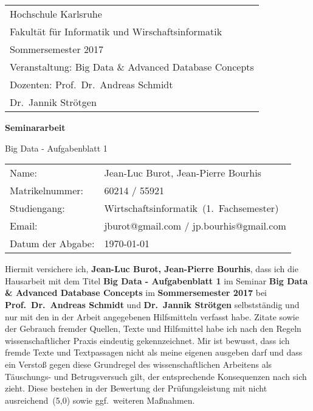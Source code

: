 \documentclass[
     11pt,         %
     a4paper,      %
     oneside,
     ]{article}
\makeatletter
\newcommand{\mytitle}{Big Data - Aufgabenblatt 1}
\newcommand{\myauthor}{Jean-Luc Burot, Jean-Pierre Bourhis}
\newcommand{\myseminar}{Big Data \& Advanced Database Concepts}
\newcommand{\mysemester}{Sommersemester 2017}
\newcommand{\mydozent}{Prof.~Dr.~Andreas Schmidt}
\newcommand{\mydozentTwo}{Dr.~Jannik Str\"otgen}
\newcommand{\myMatrikelnummer}{60214 / 55921}
\newcommand{\myStudiengang}{Wirtschaftsinformatik}
\newcommand{\mySemester}{1}
\newcommand{\myEmail}{jburot@gmail.com / jp.bourhis@gmail.com}
\makeatother
\begin{document}
\begin{titlepage}
\begin{tabular}[l]{l}
Hochschule Karlsruhe\\
Fakult\"at f\"ur Informatik und Wirschaftsinformatik\\
\mysemester\\
Veranstaltung: \myseminar\\
Dozenten: \mydozent\\
\phantom{Dozenten: }\mydozentTwo\\
\end{tabular}

\vspace{4cm}
\begin{center}
\textbf{\large Seminararbeit} %
\vspace{0.5\baselineskip}

{\huge
\mytitle
}
\end{center}

\vfill 
\begin{tabular}[l]{ll}
Name:           & \myauthor\\
Matrikelnummer: & \myMatrikelnummer\\
Studiengang:    & \myStudiengang\ (\mySemester.\ Fachsemester)\\
Email: & \myEmail\\
Datum der Abgabe: & \today \\
\end{tabular}

\end{titlepage}

\onehalfspacing


\thispagestyle{empty}
\vspace*{100pt}
Hiermit versichere ich, \textbf{\myauthor}, dass ich die Hausarbeit mit dem Titel \textbf{\mytitle}
im Seminar \textbf{\myseminar}
im \textbf{\mysemester} bei \textbf{\mydozent} und \textbf{\mydozentTwo}
selbstständig und nur mit den in der Arbeit angegebenen Hilfsmitteln verfasst habe.
Zitate sowie der Gebrauch fremder Quellen, Texte und Hilfsmittel habe ich nach den
Regeln wissenschaftlicher Praxis eindeutig gekennzeichnet. 
Mir ist bewusst, dass ich
fremde Texte und Textpassagen nicht als meine eigenen ausgeben darf und dass ein
Verstoß gegen diese Grundregel des wissenschaftlichen Arbeitens als Täuschungs- und
Betrugsversuch gilt, der entsprechende Konsequenzen nach sich zieht. Diese bestehen
in der Bewertung der Prüfungsleistung mit \glqq nicht ausreichend\grqq\ (5,0) sowie ggf.\ weiteren
Maßnahmen.
\end{document}
